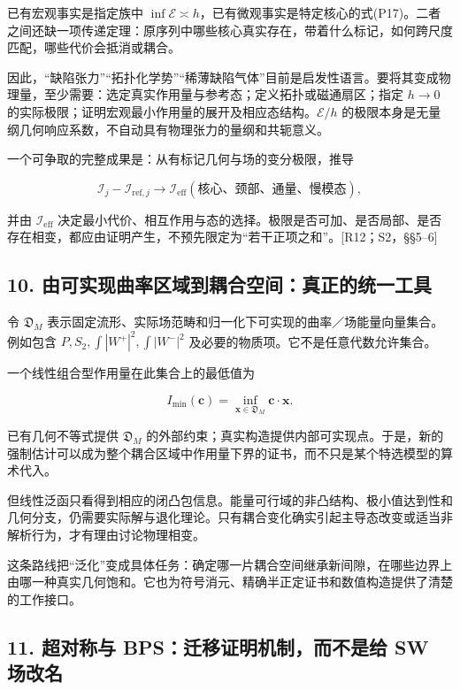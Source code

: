 \documentclass[UTF8,a4paper,11pt,fontset=fandol]{ctexart}
\begin{document}
已有宏观事实是指定族中
\(\inf\mathcal E\asymp h\)，已有微观事实是特定核心的式(P17)。二者之间还缺一项传递定理：原序列中哪些核心真实存在，带着什么标记，如何跨尺度匹配，哪些代价会抵消或耦合。

因此，``缺陷张力''``拓扑化学势''``稀薄缺陷气体''目前是启发性语言。要将其变成物理量，至少需要：选定真实作用量与参考态；定义拓扑或磁通扇区；指定
\(h\to0\)
的实际极限；证明宏观最小作用量的展开及相应态结构。\(\mathcal E/h\)
的极限本身是无量纲几何响应系数，不自动具有物理张力的量纲和共轭意义。

一个可争取的完整成果是：从有标记几何与场的变分极限，推导

\[
\mathscr I_j-\mathscr I_{\mathrm{ref},j}
\longrightarrow
\mathscr I_{\mathrm{eff}}(\text{核心、颈部、通量、慢模态}),
\tag{P18}
\]

并由 \(\mathscr I_{\mathrm{eff}}\)
决定最小代价、相互作用与态的选择。极限是否可加、是否局部、是否存在相变，都应由证明产生，不预先限定为``若干正项之和''。{[}R12；S2，§§5--6{]}

\subsection{10.
由可实现曲率区域到耦合空间：真正的统一工具}\label{ux7531ux53efux5b9eux73b0ux66f2ux7387ux533aux57dfux5230ux8026ux5408ux7a7aux95f4ux771fux6b63ux7684ux7edfux4e00ux5de5ux5177}

令 \(\mathfrak D_M\)
表示固定流形、实际场范畴和归一化下可实现的曲率／场能量向量集合。例如包含
\(P,S_2,\int|W^+|^2,\int|W^-|^2\)
及必要的物质项。它不是任意代数允许集合。

一个线性组合型作用量在此集合上的最低值为

\[
I_{\min}(\mathbf c)=\inf_{\mathbf x\in\mathfrak D_M}
\mathbf c\cdot\mathbf x.
\tag{P19}
\]

已有几何不等式提供 \(\mathfrak D_M\)
的外部约束；真实构造提供内部可实现点。于是，新的强制估计可以成为整个耦合区域中作用量下界的证书，而不只是某个特选模型的算术代入。

但线性泛函只看得到相应的闭凸包信息。能量可行域的非凸结构、极小值达到性和几何分支，仍需要实际解与退化理论。只有耦合变化确实引起主导态改变或适当非解析行为，才有理由讨论物理相变。

这条路线把``泛化''变成具体任务：确定哪一片耦合空间继承新间隙，在哪些边界上由哪一种真实几何饱和。它也为符号消元、精确半正定证书和数值构造提供了清楚的工作接口。

\subsection{11. 超对称与 BPS：迁移证明机制，而不是给 SW
场改名}\label{ux8d85ux5bf9ux79f0ux4e0e-bpsux8fc1ux79fbux8bc1ux660eux673aux5236ux800cux4e0dux662fux7ed9-sw-ux573aux6539ux540d}
\end{document}
